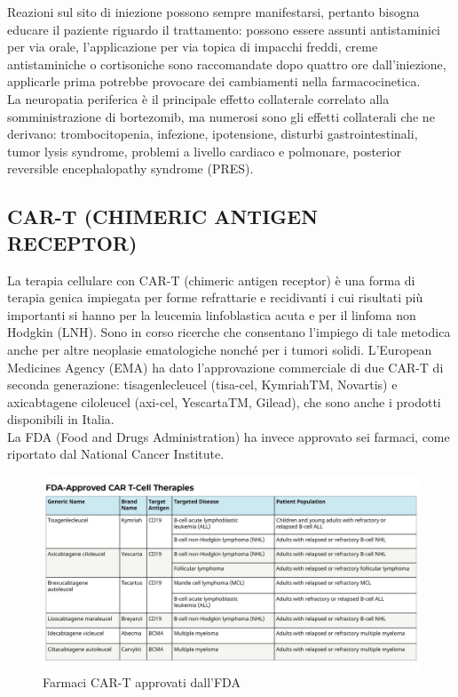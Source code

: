 Reazioni sul sito di iniezione possono sempre manifestarsi, pertanto bisogna educare il paziente riguardo il 
trattamento: possono essere assunti antistaminici per via orale, l’applicazione per via topica di impacchi freddi, 
creme antistaminiche o cortisoniche sono raccomandate dopo quattro ore dall’iniezione, 
applicarle prima potrebbe provocare dei cambiamenti nella farmacocinetica\cite{BORTEZOMIB}.\\
La neuropatia periferica è il principale effetto collaterale correlato alla somministrazione di bortezomib, 
ma numerosi sono gli effetti collaterali che ne derivano: trombocitopenia, infezione, ipotensione, disturbi 
gastrointestinali, tumor lysis syndrome, problemi a livello cardiaco e polmonare, posterior reversible 
encephalopathy syndrome (PRES)\cite{BORTNURSES}.\\ 

\subsection{CAR-T (CHIMERIC ANTIGEN RECEPTOR)}

La terapia cellulare con CAR-T (chimeric antigen receptor) è una forma di terapia genica impiegata per forme 
refrattarie e recidivanti  i cui risultati più importanti si hanno per la leucemia linfoblastica acuta e per il 
linfoma non Hodgkin (LNH). Sono in corso ricerche che consentano l’impiego di tale metodica anche per altre neoplasie 
ematologiche nonché per i tumori solidi.
L’European Medicines Agency (EMA) ha dato l’approvazione commerciale di due CAR-T di seconda generazione: 
tisagenlecleucel (tisa-cel, KymriahTM, Novartis) e axicabtagene ciloleucel (axi-cel, YescartaTM, Gilead), 
che sono anche i prodotti disponibili in Italia\cite{reteveneta}.\\
La FDA (Food and Drugs Administration) ha invece approvato sei farmaci, come 
riportato dal National Cancer Institute\cite{NIHCART}.\\

\begin{figure}[H]
    \begin{center}
    \includegraphics[width=1.0\columnwidth]{img/FDA Approved CAR T-Cell Therapies Table.jpeg}
    \end{center}
    \caption[Farmaci CAR-T approvati dall’FDA]{Farmaci CAR-T approvati dall’FDA
    \cite{img22}}

\end{figure}

